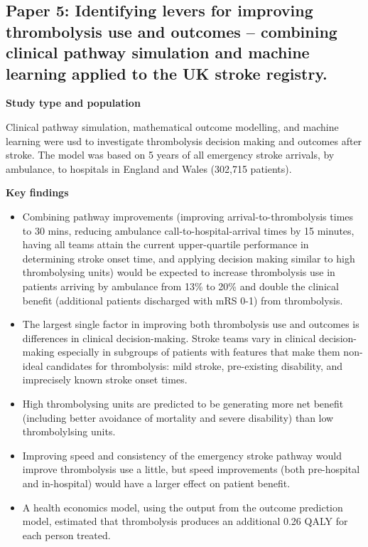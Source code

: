 \subsection{Paper 5: Identifying levers for improving thrombolysis use and outcomes – combining clinical pathway simulation and machine learning applied to the UK stroke registry.\cite{pearn_identifying_2024}}

\textbf{Study type and population}

Clinical pathway simulation, mathematical outcome modelling, and machine learning were usd to investigate thrombolysis decision making and outcomes after stroke. The model was based on 5 years of all emergency stroke arrivals, by ambulance, to hospitals in England and Wales (302,715 patients).

\textbf{Key findings}

\begin{itemize}
    \item Combining pathway improvements (improving arrival-to-thrombolysis times to 30 mins, reducing ambulance call-to-hospital-arrival times by 15 minutes, having all teams attain the current upper-quartile performance in determining stroke onset time, and applying decision making similar to high thrombolysing units) would be expected to increase thrombolysis use in patients arriving by ambulance from 13\% to 20\% and double the clinical benefit (additional patients discharged with mRS 0-1) from thrombolysis.
    
    \item The largest single factor in improving both thrombolysis use and outcomes is differences in clinical decision-making. Stroke teams vary in clinical decision-making especially in subgroups of patients with features that make them non-ideal candidates for thrombolysis: mild stroke, pre-existing disability, and imprecisely known stroke onset times.
    
    \item High thrombolysing units are predicted to be generating more net benefit (including better avoidance of mortality and severe disability) than low thrombolylsing units.

    \item Improving speed and consistency of the emergency stroke pathway would improve thrombolysis use a little, but speed improvements (both pre-hospital and in-hospital) would have a larger effect on patient benefit.
    
    \item A health economics model, using the output from the outcome prediction model, estimated that thrombolysis produces an additional 0.26 QALY for each person treated.

\end{itemize}

